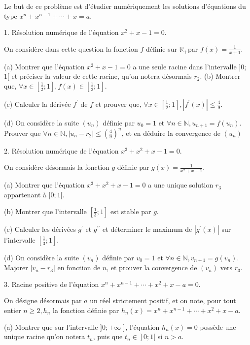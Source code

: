 \documentclass[a4paper, 11pt,reqno]{article}
\begin{document}
\begin{exercice}
Le but de ce problème est d'étudier numériquement les solutions d'équations du type $x^{n}+x^{n-1}+\cdots+x=a$.

1. Résolution numérique de l'équation $x^{2}+x-1=0$.

On considère dans cette question la fonction $f$ définie sur $\mathbb{R}_{+}$par $f(x)=\frac{1}{x+1}$.

(a) Montrer que l'équation $x^{2}+x-1=0$ a une seule racine dans l'intervalle ]0; 1[ et préciser la valeur de cette racine, qu'on notera désormais $r_{2}$. (b) Montrer que, $\forall x \in\left[\frac{1}{2} ; 1\right], f(x) \in\left[\frac{1}{2} ; 1\right]$.

(c) Calculer la dérivée $f^{\prime}$ de $f$ et prouver que, $\forall x \in\left[\frac{1}{2} ; 1\right],\left|f^{\prime}(x)\right| \leq \frac{4}{9}$.

(d) On considère la suite $\left(u_{n}\right)$ définie par $u_{0}=1$ et $\forall n \in \mathbb{N}, u_{n+1}=f\left(u_{n}\right) .$ Prouver que $\forall n \in \mathbb{N},\left|u_{n}-r_{2}\right| \leq\left(\frac{4}{9}\right)^{n}$, et en déduire la convergence de $\left(u_{n}\right)$

2. Résolution numérique de l'équation $x^{3}+x^{2}+x-1=0$.

On considère désormais la fonction $g$ définie par $g(x)=\frac{1}{x^{2}+x+1}$.

(a) Montrer que l'équation $x^{3}+x^{2}+x-1=0$ a une unique solution $r_{3}$ appartenant à $] 0 ; 1[$.

(b) Montrer que l'intervalle $\left[\frac{1}{3} ; 1\right]$ est stable par $g$.

(c) Calculer les dérivées $g^{\prime}$ et $g^{\prime \prime}$ et déterminer le maximum de $\left|g^{\prime}(x)\right|$ sur l'intervalle $\left[\frac{1}{3} ; 1\right]$.

(d) On considère la suite $\left(v_{n}\right)$ définie par $v_{0}=1$ et $\forall n \in \mathbb{N}, v_{n+1}=g\left(v_{n}\right) .$ Majorer $\left|v_{n}-r_{3}\right|$ en fonction de $n$, et prouver la convergence de $\left(v_{n}\right)$ vers $r_{3}$.

3. Racine positive de l'équation $x^{n}+x^{n-1}+\cdots+x^{2}+x-a=0$.

On désigne désormais par $a$ un réel strictement positif, et on note, pour tout entier $n \geq 2, h_{n}$ la fonction définie par $h_{n}(x)=x^{n}+x^{n-1}+\cdots+x^{2}+x-a$.

(a) Montrer que sur l'intervalle $] 0 ;+\infty\left[\right.$, l'équation $h_{n}(x)=0$ possède une unique racine qu'on notera $t_{n}$, puis que $\left.t_{n} \in\right] 0 ; 1[$ si $n>a$.


\end{exercice}
\end{document}
